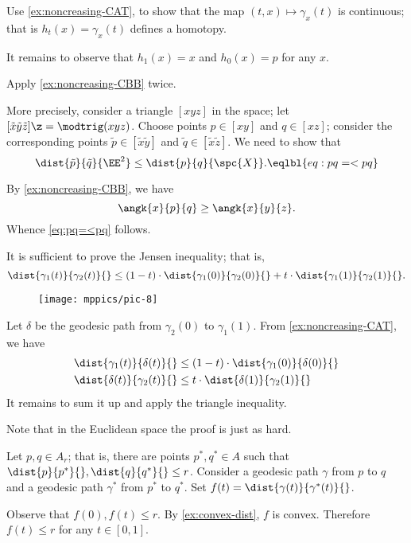 Use \ref{ex:noncreasing-CAT}, to show that the map $(t,x)\mapsto \gamma_x(t)$ is continuous; that is $h_t(x)=\gamma_x(t)$ defines a homotopy.

It remains to observe that $h_1(x)=x$ and $h_0(x)=p$ for any $x$.




Apply \ref{ex:noncreasing-CBB} twice.

More precisely, consider a triangle $[xyz]$ in the space; let $[\tilde x\tilde y\tilde z]\z=\modtrig(xyz)$.
Choose points $p\in[xy]$ and $q\in[xz]$;
consider the corresponding points $\tilde p\in[\tilde x\tilde y]$ and $\tilde q\in[\tilde x\tilde z]$.
We need to show that 
\[\dist{\tilde p}{\tilde q}{\EE^2}\le \dist{ p}{q}{\spc{X}}.
\eqlbl{eq:pq=<pq}\]

By \ref{ex:noncreasing-CBB}, we have
\[\angk{x}{p}{q}\ge\angk{x}{y}{z}.\]
Whence \ref{eq:pq=<pq} follows.


It is sufficient to prove the Jensen inequality;
that is, 
\[
\dist{\gamma_1(t)}{\gamma_2(t)}{}
\le
(1-t)\cdot\dist{\gamma_1(0)}{\gamma_2(0)}{}
+
t\cdot \dist{\gamma_1(1)}{\gamma_2(1)}{}.
\]

{

\begin{wrapfigure}{o}{45 mm}
\vskip-4mm
\centering
\texttt{[image: mppics/pic-8]}
\end{wrapfigure}

Let $\delta$ be the geodesic path from $\gamma_2(0)$ to $\gamma_1(1)$.
From \ref{ex:noncreasing-CAT}, we have
\begin{align*}
\dist{\gamma_1(t)}{\delta(t)}{}
&\le
(1-t)\cdot\dist{\gamma_1(0)}{\delta(0)}{}
\\
\dist{\delta(t)}{\gamma_2(t)}{}
&\le
t\cdot\dist{\delta(1)}{\gamma_2(1)}{}
\end{align*}
It remains to sum it up and apply the triangle inequality.

}

 Note that in the Euclidean space the proof is just as hard.

Let $p,q\in A_r$;
that is, there are points $p^*,q^*\in A$ such that $\dist{p}{p^*}{},\dist{q}{q^*}{}\le r$.
Consider a geodesic path $\gamma$ from $p$ to $q$ and a geodesic path $\gamma^*$ from $p^*$ to $q^*$.
Set $f(t)=\dist{\gamma(t)}{\gamma^*(t)}{}$.

Observe that $f(0),f(t)\le r$.
By \ref{ex:convex-dist}, $f$ is convex.
Therefore $f(t)\le r$ for any $t\in[0,1]$.

